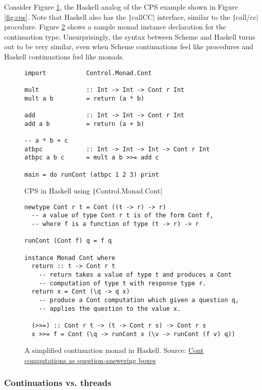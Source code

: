 \documentclass[]{article}
\begin{document}
Consider Figure \ref{fig:hask}, the Haskell analog of the CPS example shown in Figure \ref{fig:cps}. Note that Haskell also has the \texttt|callCC| interface, similar to the \texttt|call/cc| procedure. Figure \ref{fig:mona} shows a sample monad instance declaration for the continuation type. Unsurprisingly, the syntax between Scheme and Haskell turns out to be very similar, even when Scheme continuations feel like procedures and Haskell continuations feel like monads.

\begin{figure}[]
  \centering
\begin{verbatim}
import           Control.Monad.Cont

mult             :: Int -> Int -> Cont r Int
mult a b         = return (a * b)

add              :: Int -> Int -> Cont r Int
add a b          = return (a + b)

-- a * b + c
atbpc            :: Int -> Int -> Int -> Cont r Int
atbpc a b c      = mult a b >>= add c

main = do runCont (atbpc 1 2 3) print
\end{verbatim}
  \caption{CPS in Haskell using \texttt|Control.Monad.Cont|}
  \label{fig:hask}
\end{figure}

\begin{figure}[]
  \centering
\begin{verbatim}
newtype Cont r t = Cont ((t -> r) -> r)
  -- a value of type Cont r t is of the form Cont f,
  -- where f is a function of type (t -> r) -> r

runCont (Cont f) q = f q

instance Monad Cont where
  return :: t -> Cont r t
    -- return takes a value of type t and produces a Cont
    -- computation of type t with response type r.
  return x = Cont (\q -> q x)
    -- produce a Cont computation which given a question q,
    -- applies the question to the value x.

  (>>=) :: Cont r t -> (t -> Cont r s) -> Cont r s
  x >>= f = Cont (\q -> runCont x (\v -> runCont (f v) q))
\end{verbatim}
  \caption{A simplified continuation monad in Haskell. Source: \href{https://wiki.haskell.org/Cont_computations_as_question-answering_boxes}{Cont computations as question-answering boxes}}
  \label{fig:mona}
\end{figure}

\subsubsection{Continuations vs. threads}
\label{sec:vsth}
\end{document}
